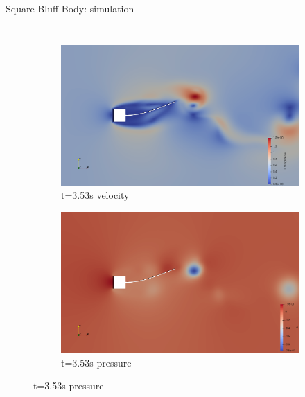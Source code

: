 \documentclass[10pt,t]{beamer}
\begin{document}
\begin{frame}{Square Bluff Body: simulation}
\begin{columns}
\begin{figure}[t]
\begin{subfigure}{0.5\textwidth}
  \includegraphics[width=\linewidth]{images/sq-cyl/sq_v3.png}
  \caption{t=3.53s velocity}
\end{subfigure}\hfil %
\begin{subfigure}{0.5\textwidth}
  \includegraphics[width=\linewidth]{images/sq-cyl/sq_p3.png}
  \caption{t=3.53s pressure}
\end{subfigure}\hfil %

\end{figure}



\end{columns}
\end{frame}
\end{document}
